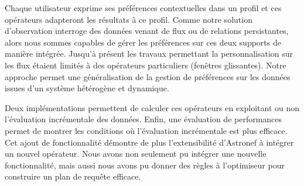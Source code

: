 Chaque utilisateur exprime ses préférences contextuelles dans un profil et ces opérateurs adapteront les résultats à ce profil. Comme notre solution d'observation interroge des données venant de flux ou de relations persistantes, alors nous sommes capables de gérer les préférences sur ces deux supports de manière intégrée. Jusqu'à présent les travaux permettant la personnalisation sur les flux étaient limités à des opérateurs particuliers (fenêtres glissantes). Notre approche permet une généralisation de la gestion de préférences sur les données issues d'un système hétérogène et dynamique.

Deux implémentations permettent de calculer ces opérateurs en exploitant ou non l'évaluation incrémentale des données. Enfin, une évaluation de performances permet de montrer les conditions où l'évaluation incrémentale est plus efficace. Cet ajout de fonctionnalité démontre de plus l'extensibilité d'Astronef à intégrer un nouvel opérateur. Nous avons non seulement pu intégrer une nouvelle fonctionnalité, mais aussi nous avons pu donner des règles à l'optimiseur pour construire un plan de requête efficace.
